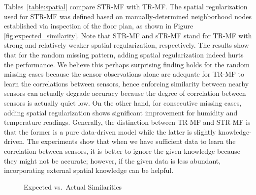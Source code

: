 Tables~\ref{table:spatial} compare STR-MF with TR-MF.
The spatial regularization used for STR-MF was defined based on manually-determined neighborhood nodes established via inspection of the floor plan, as shown in Figure \ref{fig:expected_similarity}.
Note that STR-MF and sTR-MF stand for TR-MF with strong and relatively weaker spatial regularization, respectively.
The results show that for the random missing pattern, adding spatial regularization indeed hurts the performance.
We believe this perhaps surprising finding holds for the random missing cases because the sensor observations alone are adequate for TR-MF to learn the correlations between sensors, hence enforcing similarity between nearby sensors can actually degrade accuracy because the degree of correlation between sensors is actually quiet low.
On the other hand, for consecutive missing cases, adding spatial regularization shows significant improvement for humidity and temperature readings.
Generally, the distinction between TR-MF and STR-MF is that the former is a pure data-driven model while the latter is slightly knowledge-driven.
The experiments show that when we have sufficient data to learn the correlation between sensors, it is better to ignore the given knowledge because they might not be accurate; however, if the given data is less abundant, incorporating external spatial knowledge can be helpful.


\begin{figure}[h]
\centering
{}
\vspace{-0.1in}
\caption{Expected vs.~Actual Similarities}
\label{fig:similarity}
\end{figure}


